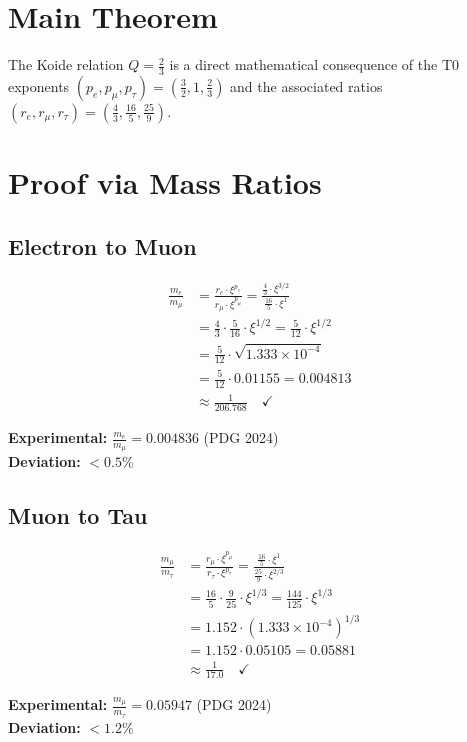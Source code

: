 	\section{Main Theorem}
	
	\begin{theorem}
		The Koide relation $Q = \frac{2}{3}$ is a direct mathematical consequence of the T0 exponents $(p_e, p_\mu, p_\tau) = \left(\frac{3}{2}, 1, \frac{2}{3}\right)$ and the associated ratios $(r_e, r_\mu, r_\tau) = \left(\frac{4}{3}, \frac{16}{5}, \frac{25}{9}\right)$.
	\end{theorem}
	
	\section{Proof via Mass Ratios}
	
	\subsection{Electron to Muon}
	
	\begin{beweis}
		\allowdisplaybreaks
		\begin{align}
			\frac{m_e}{m_\mu} &= \frac{r_e \cdot \xi^{p_e}}{r_\mu \cdot \xi^{p_\mu}} = \frac{\frac{4}{3} \cdot \xi^{3/2}}{\frac{16}{5} \cdot \xi^1} \\
			&= \frac{4}{3} \cdot \frac{5}{16} \cdot \xi^{1/2} = \frac{5}{12} \cdot \xi^{1/2} \\
			&= \frac{5}{12} \cdot \sqrt{1.333 \times 10^{-4}} \\
			&= \frac{5}{12} \cdot 0.01155 = 0.004813 \\
			&\approx \frac{1}{206.768} \quad \checkmark
		\end{align}
		
		\textbf{Experimental:} $\frac{m_e}{m_\mu} = 0.004836$ (PDG 2024)\\
		\textbf{Deviation:} $< 0.5\%$
	\end{beweis}
	
	\subsection{Muon to Tau}
	
	\begin{beweis}
		\begin{align}
			\frac{m_\mu}{m_\tau} &= \frac{r_\mu \cdot \xi^{p_\mu}}{r_\tau \cdot \xi^{p_\tau}} = \frac{\frac{16}{5} \cdot \xi^1}{\frac{25}{9} \cdot \xi^{2/3}} \\
			&= \frac{16}{5} \cdot \frac{9}{25} \cdot \xi^{1/3} = \frac{144}{125} \cdot \xi^{1/3} \\
			&= 1.152 \cdot (1.333 \times 10^{-4})^{1/3} \\
			&= 1.152 \cdot 0.05105 = 0.05881 \\
			&\approx \frac{1}{17.0} \quad \checkmark
		\end{align}
		
		\textbf{Experimental:} $\frac{m_\mu}{m_\tau} = 0.05947$ (PDG 2024)\\
		\textbf{Deviation:} $< 1.2\%$
	\end{beweis}
	
